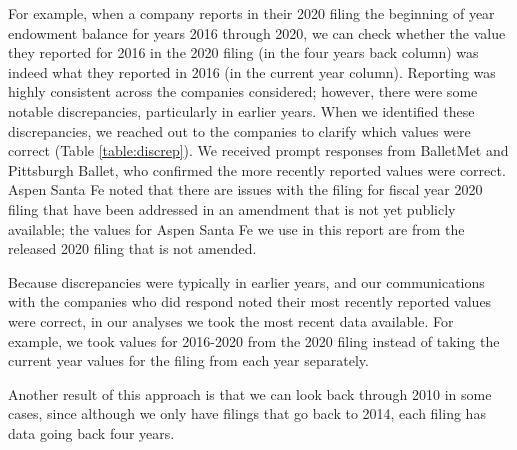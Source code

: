 \documentclass[Dance Data
Project,article,submit,moreauthors,pdftex]{mdpi}
\begin{document}
For example, when a company reports in their 2020 filing the beginning
of year endowment balance for years 2016 through 2020, we can check
whether the value they reported for 2016 in the 2020 filing (in the four
years back column) was indeed what they reported in 2016 (in the current
year column). Reporting was highly consistent across the companies
considered; however, there were some notable discrepancies, particularly
in earlier years. When we identified these discrepancies, we reached out
to the companies to clarify which values were correct (Table
\ref{table:discrep}). We received prompt responses from BalletMet and
Pittsburgh Ballet, who confirmed the more recently reported values were
correct. Aspen Santa Fe noted that there are issues with the filing for
fiscal year 2020 filing that have been addressed in an amendment that is
not yet publicly available; the values for Aspen Santa Fe we use in this
report are from the released 2020 filing that is not amended.

Because discrepancies were typically in earlier years, and our
communications with the companies who did respond noted their most
recently reported values were correct, in our analyses we took the most
recent data available. For example, we took values for 2016-2020 from
the 2020 filing instead of taking the current year values for the filing
from each year separately.

Another result of this approach is that we can look back through 2010 in
some cases, since although we only have filings that go back to 2014,
each filing has data going back four years.
\end{document}
